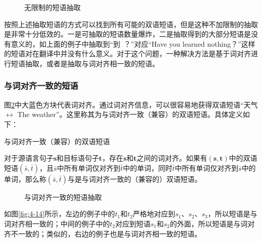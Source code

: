 \begin{figure}[htp]
\centering

\caption{无限制的短语抽取}
\label{fig:4-12}
\end{figure}

\parinterval 按照上述抽取短语的方式可以找到所有可能的双语短语，但是这种不加限制的抽取是非常十分低效的。一是可抽取的短语数量爆炸，二是抽取得到的大部分短语是没有意义的，如上面的例子中抽取到``到\ ？''对应``Have you learned nothing？''这样的短语对在翻译中并没有什么意义。对于这个问题，一种解决方法是基于词对齐进行短语抽取，或者是抽取与词对齐相一致的短语。


\subsubsection{与词对齐一致的短语}

\parinterval 图\ref{fig:4-13}中大蓝色方块代表词对齐。通过词对齐信息，可以很容易地获得双语短语``天气 $\leftrightarrow$ The weather''。这里称其为与词对齐一致（兼容）的双语短语。具体定义如下：

\vspace{0.5em}
\begin{definition} 与词对齐一致（兼容）的双语短语

{\small
对于源语言句子$\mathbf{s}$和目标语句子$\mathbf{t}$，存在$\mathbf{s}$和$\mathbf{t}$之间的词对齐。如果有$(\mathbf{s},\mathbf{t})$中的双语短语$(\bar{s},\bar{t})$，且$\bar{s}$中所有单词仅对齐到$\bar{t}$中的单词，同时$\bar{t}$中所有单词仅对齐到$\bar{s}$中的单词，那么称$(\bar{s},\bar{t})$与是与词对齐一致的（兼容的）双语短语。
}
\end{definition}

\begin{figure}[htp]
\centering

\caption{与词对齐一致的短语抽取}
\label{fig:4-13}
\end{figure}

\parinterval 如图\ref{fig:4-14}所示，左边的例子中的$t_1$和$t_2$严格地对应到$s_1$、$s_2$、$s_3$，所以短语是与词对齐相一致的；中间的例子中的$t_2$对应到短语$s_1$和$s_2$的外面，所以短语是与词对齐不一致的；类似的，右边的例子也是与词对齐相一致的短语。

